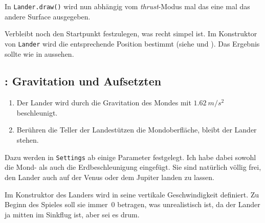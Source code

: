 
In \texttt{Lander.draw()} wird nun abhängig vom \emph{thrust}-Modus mal das eine mal das andere Surface ausgegeben.


Verbleibt noch den Startpunkt festzulegen, was recht simpel ist. Im Konstruktor von \texttt{Lander} wird die entsprechende Position bestimmt (siehe  und ). Das Ergebnis sollte wie in  aussehen.



\subsection{: Gravitation und Aufsetzten}

\begin{enumerate}
	\item Der Lander wird durch die Gravitation des Mondes mit $1.62~m/s^2$ beschleunigt.\label{reqLanderGravitation}
	\item Berühren die Teller der Landestützen die Mondoberfläche, bleibt der Lander stehen. \label{reqLanderAufsetzen}
\end{enumerate}
\er

Dazu werden in \texttt{Settings} ab  einige Parameter festgelegt. Ich habe dabei sowohl die Mond- als auch die Erdbeschleunigung eingefügt. Sie sind natürlich völlig frei, den Lander auch auf der Venus oder dem Jupiter landen zu lassen.


Im Konstruktor des Landers wird in  seine vertikale Geschwindigkeit definiert. Zu Beginn des Spieles soll sie immer~0 betragen, was unrealistisch ist, da der Lander ja mitten im Sinkflug ist, aber sei es drum.

